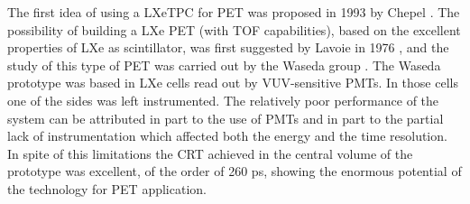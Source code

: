 \documentclass[review]{elsarticle}
\begin{document}
The first idea of using a LXeTPC for PET was proposed in 1993 by Chepel \cite{chepelFirst}. 
%
The possibility of building a LXe PET (with TOF capabilities), based on the excellent properties of LXe as scintillator, was first suggested by Lavoie in 1976 \cite{lavoie}, and the study of this type of PET was carried out by the Waseda group \cite{Doke1,Nishikido2,Nishikido1}. The Waseda prototype was based in LXe cells read out by VUV-sensitive PMTs. In those cells one of the sides was left instrumented. The relatively poor performance of the system can be attributed in part to the use of PMTs and in part to the partial lack of instrumentation which affected both the energy and the time resolution. In spite of this limitations 
the CRT achieved in the central volume of the prototype was excellent, of the order of 260 ps, showing the enormous potential of the technology for PET application. 
\end{document}
